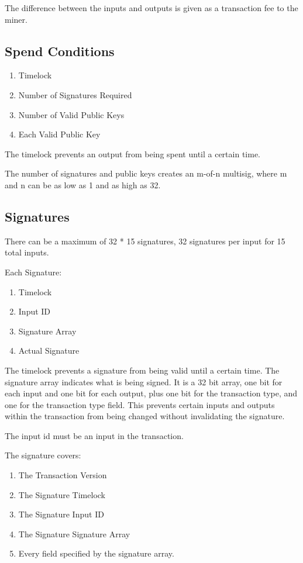 \documentclass[twocolumn]{article}
\begin{document}
The difference between the inputs and outputs is given as a transaction fee to the miner.

\subsection{Spend Conditions}
\begin{enumerate}
	\item Timelock
	\item Number of Signatures Required
	\item Number of Valid Public Keys
	\item Each Valid Public Key
\end{enumerate}

The timelock prevents an output from being spent until a certain time.

The number of signatures and public keys creates an m-of-n multisig, where m and n can be as low as 1 and as high as 32.

\subsection{Signatures}
There can be a maximum of 32 * 15 signatures, 32 signatures per input for 15 total inputs.

Each Signature:
\begin{enumerate}
	\item Timelock
	\item Input ID
	\item Signature Array
	\item Actual Signature
\end{enumerate}

The timelock prevents a signature from being valid until a certain time.
The signature array indicates what is being signed.
It is a 32 bit array, one bit for each input and one bit for each output, plus one bit for the transaction type, and one for the transaction type field.
This prevents certain inputs and outputs within the transaction from being changed without invalidating the signature.

The input id must be an input in the transaction.

The signature covers:
\begin{enumerate}
	\item The Transaction Version
	\item The Signature Timelock
	\item The Signature Input ID
	\item The Signature Signature Array
	\item Every field specified by the signature array.
\end{enumerate}
\end{document}

